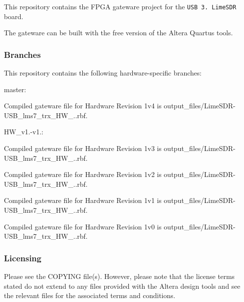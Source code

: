 This repository contains the F\+P\+GA gateware project for the {\tt U\+SB 3. Lime\+S\+DR} board.

The gateware can be built with the free version of the Altera Quartus tools.

\subsubsection*{Branches}

This repository contains the following hardware-\/specific branches\+:


\begin{DoxyItemize}
\item master\+:
\begin{DoxyItemize}
\item Compiled gateware file for Hardware Revision 1v4 is output\+\_\+files/\+Lime\+S\+D\+R-\/\+U\+S\+B\+\_\+lms7\+\_\+trx\+\_\+\+H\+W\+\_..\+rbf.
\end{DoxyItemize}
\item H\+W\+\_\+v1.-\/v1.\+:
\begin{DoxyItemize}
\item Compiled gateware file for Hardware Revision 1v3 is output\+\_\+files/\+Lime\+S\+D\+R-\/\+U\+S\+B\+\_\+lms7\+\_\+trx\+\_\+\+H\+W\+\_..\+rbf.
\item Compiled gateware file for Hardware Revision 1v2 is output\+\_\+files/\+Lime\+S\+D\+R-\/\+U\+S\+B\+\_\+lms7\+\_\+trx\+\_\+\+H\+W\+\_..\+rbf.
\item Compiled gateware file for Hardware Revision 1v1 is output\+\_\+files/\+Lime\+S\+D\+R-\/\+U\+S\+B\+\_\+lms7\+\_\+trx\+\_\+\+H\+W\+\_..\+rbf.
\item Compiled gateware file for Hardware Revision 1v0 is output\+\_\+files/\+Lime\+S\+D\+R-\/\+U\+S\+B\+\_\+lms7\+\_\+trx\+\_\+\+H\+W\+\_..\+rbf.
\end{DoxyItemize}
\end{DoxyItemize}

\subsubsection*{Licensing}

Please see the C\+O\+P\+Y\+I\+NG file(s). However, please note that the license terms stated do not extend to any files provided with the Altera design tools and see the relevant files for the associated terms and conditions. 